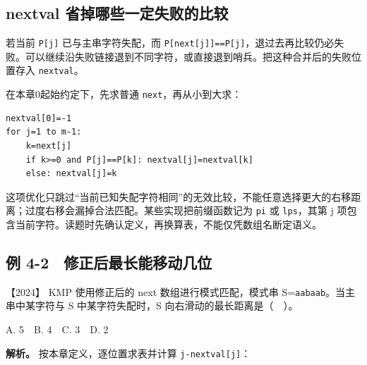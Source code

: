 \subsection{nextval 省掉哪些一定失败的比较}\label{ds-c04-h90}

若当前 \allowbreak{}\texttt{P{[}j{]}} 已与主串字符失配，而 \allowbreak{}\texttt{P{[}next{[}j{]}{]}==P{[}j{]}}，退过去再比较仍必失败。可以继续沿失败链接退到不同字符，或直接退到哨兵。把这种合并后的失败位置存入 \allowbreak{}\texttt{nextval}。

在本章0起始约定下，先求普通 \allowbreak{}\texttt{next}，再从小到大求：

\par\medskip\noindent
\begin{minipage}{\linewidth}
\begin{verbatim}
nextval[0]=-1
for j=1 to m-1:
    k=next[j]
    if k>=0 and P[j]==P[k]: nextval[j]=nextval[k]
    else: nextval[j]=k
\end{verbatim}
\end{minipage}\par\medskip

这项优化只跳过``当前已知失配字符相同''的无效比较，不能任意选择更大的右移距离；过度右移会漏掉合法匹配。某些实现把前缀函数记为 \allowbreak{}\texttt{pi} 或 \allowbreak{}\texttt{lps}，其第 j 项包含当前字符。读题时先确认定义，再换算表，不能仅凭数组名断定语义。

\subsection{例 4-2　修正后最长能移动几位}\label{ds-ex4-2}

\noindent{}【2024】 KMP 使用修正后的 next 数组进行模式匹配，模式串 S=\allowbreak{}\texttt{aabaab}。当主串中某字符与 S 中某字符失配时，S 向右滑动的最长距离是（　）。

A. 5　B. 4　C. 3　D. 2


\textbf{解析。} 按本章定义，逐位置求表并计算 \allowbreak{}\texttt{j-nextval{[}j{]}}：

